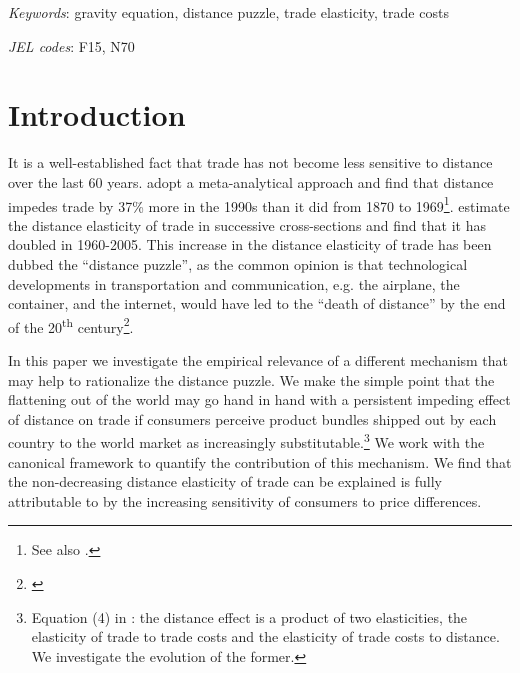 \documentclass[12pt,twoside,a4paper,notitlepage]{article}
\begin{document}
\textit{Keywords}: gravity equation, distance puzzle, trade elasticity, trade costs

\textit{JEL codes}: F15, N70
\clearpage

\section*{Introduction}

It is a well-established fact that trade has not become less sensitive to distance over the last 60 years. \cite{Disdier2008} adopt a meta-analytical approach and find that distance impedes trade by 37\% more in the 1990s than it did from 1870 to 1969\footnote{See also \cite{Berthelon2008,Combes2006, Brun2005, Buch2004}.}.
\cite{Head2013} estimate the distance elasticity of trade in successive cross-sections and find that it has doubled in 1960-2005.
This increase in the distance elasticity of trade has been dubbed the  ``distance puzzle'', as the common opinion is that technological developments in transportation and communication, e.g. the airplane, the container, and the internet, would have led to the ``death of distance'' by the end of the 20\textsuperscript{th} century\footnote{\cite{Cairncross1997,Levinson2006,Friedman2007}}.

In this paper we investigate the empirical relevance of a different mechanism that may help to rationalize the distance puzzle.
We make the simple point that the flattening out of the world may go hand in hand with a persistent impeding effect of distance on trade if consumers perceive product bundles shipped out by each country to the world market as increasingly substitutable.\footnote{Equation (4) in \cite{Head2013}: the distance effect is a product of two elasticities, the elasticity of trade to trade costs and the elasticity of trade costs to distance.
We investigate the evolution of the former.} We work with the canonical \cite{Anderson2003a} framework to quantify the contribution of this mechanism.
We find that the non-decreasing distance elasticity of trade can be explained  is fully attributable to \fi by the increasing sensitivity of consumers to price differences.
 
\end{document}
